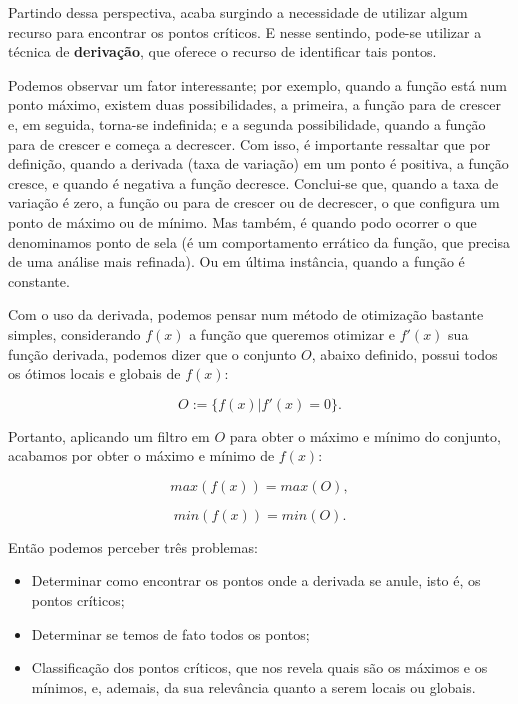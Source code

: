 Partindo dessa perspectiva, acaba surgindo a necessidade de utilizar algum
recurso para encontrar os pontos críticos. E nesse sentindo, pode-se utilizar
a técnica de \textbf{derivação}, que oferece o recurso de identificar tais
pontos.


Podemos observar um fator interessante; por exemplo,
quando a função está num ponto máximo, existem duas possibilidades, a primeira,
a função para de crescer e, em seguida, torna-se indefinida; e a
segunda possibilidade, quando a função para de crescer e começa a decrescer.
Com isso, é importante ressaltar que por definição, quando a derivada (taxa de
variação) em um ponto é positiva, a função cresce, e quando é negativa a função
decresce. Conclui-se que, quando a taxa de variação é zero, a função ou para de
crescer ou de decrescer, o que configura um ponto de máximo ou de mínimo. Mas
também, é quando podo ocorrer o que denominamos ponto de sela (é um
comportamento errático da função, que precisa de uma análise mais refinada). Ou
em última instância, quando a função é constante.

Com o uso da derivada, podemos pensar num método de otimização bastante simples,
considerando \(f(x)\) a função que queremos otimizar e \(f'(x)\) sua função
derivada, podemos dizer que o conjunto $O$, abaixo definido, possui todos os ótimos locais e
globais de \(f(x)\):

\begin{equation}
    O := \{f(x) | f'(x) = 0\}.
    \label{equacao_conjunto_o}
\end{equation}


Portanto, aplicando um filtro em $O$ para obter o máximo e mínimo do conjunto,
acabamos por obter o máximo e mínimo de \(f(x)\):


\begin{equation}
    max(f(x)) = max(O),
\end{equation}

\begin{equation}
    min(f(x)) = min(O).
\end{equation}


Então podemos perceber três problemas:

\begin{itemize}
  \item Determinar como encontrar os pontos onde a derivada se anule, isto é, os pontos críticos;
  \item Determinar se temos de fato todos os pontos;
  \item Classificação dos pontos críticos, que nos revela quais são os máximos e
  os mínimos, e, ademais, da sua relevância quanto a serem locais ou globais.
\end{itemize}

